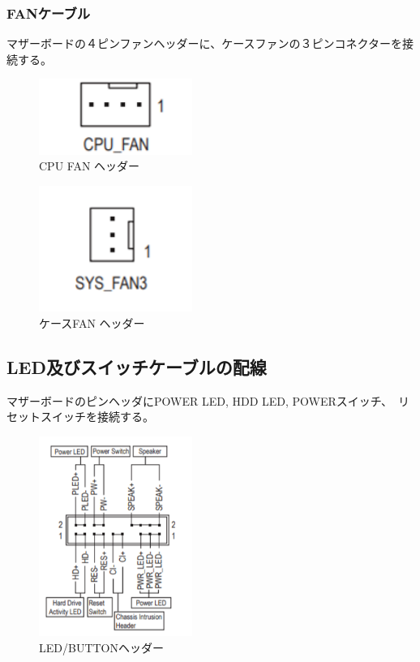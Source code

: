 \documentclass[10pt]{article}
\begin{document}
\subsubsection{FANケーブル}
\hspace{1cm}マザーボードの４ピンファンヘッダーに、ケースファンの３ピンコネクターを接続する。

\begin{figure}[H]
	\centering
	\includegraphics[width=5cm]{CPUFAN.png}
	\caption{CPU FAN ヘッダー}
	
\end{figure}

\begin{figure}[H]
	\centering
	\includegraphics[width=5cm]{SYSFAN.png}
	\caption{ケースFAN ヘッダー}
	
\end{figure}

\subsection{LED及びスイッチケーブルの配線}
\hspace{1cm}マザーボードのピンヘッダにPOWER LED, HDD LED, POWERスイッチ、　リセットスイッチを接続する。

\begin{figure}[H]
	\centering
	\includegraphics[width=5cm]{FRONT.png}
	\caption{LED/BUTTONヘッダー}
	
\end{figure}
\end{document}

